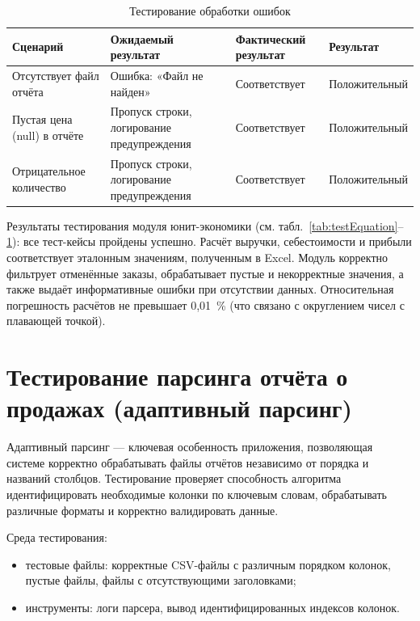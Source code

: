 \begin{table}[H]
\caption{\label{tab:testError}Тестирование обработки ошибок}
\small
\begin{center}
\vspace{-0.5cm}\begin{tabular}{|p{3cm}|p{6cm}|p{3cm}|p{3cm}|}
\hline
Сценарий & Ожидаемый результат & Фактический результат & Результат \\ \hline
Отсутствует файл отчёта & Ошибка: «Файл не найден» & Соответствует & Положительный \\ \hline
Пустая цена (null) в отчёте & Пропуск строки, логирование предупреждения & Соответствует & Положительный \\ \hline
Отрицательное количество & Пропуск строки, логирование предупреждения & Соответствует & Положительный \\ \hline
\end{tabular}
\end{center}
\end{table}

Результаты тестирования модуля юнит-экономики (см. табл.~\ref{tab:testEquation}--\ref{tab:testError}): все тест-кейсы пройдены успешно. Расчёт выручки, себестоимости и прибыли соответствует эталонным значениям, полученным в Excel. Модуль корректно фильтрует отменённые заказы, обрабатывает пустые и некорректные значения, а также выдаёт информативные ошибки при отсутствии данных. Относительная погрешность расчётов не превышает 0,01~\% (что связано с округлением чисел с плавающей точкой).

\section{Тестирование парсинга отчёта о продажах (адаптивный парсинг)}

Адаптивный парсинг — ключевая особенность приложения, позволяющая системе корректно обрабатывать файлы отчётов независимо от порядка и названий столбцов. Тестирование проверяет способность алгоритма идентифицировать необходимые колонки по ключевым словам, обрабатывать различные форматы и корректно валидировать данные.

Среда тестирования:
\begin{itemize}
\item тестовые файлы: корректные CSV-файлы с различным порядком колонок, пустые файлы, файлы с отсутствующими заголовками;
\item инструменты: логи парсера, вывод идентифицированных индексов колонок.
\end{itemize}

